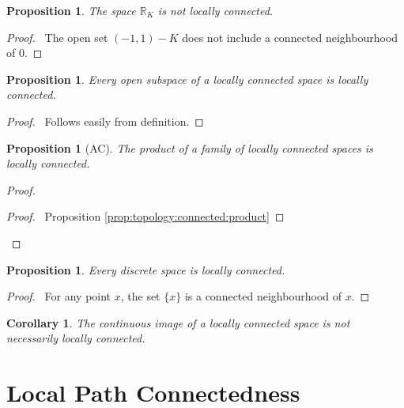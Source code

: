 \documentclass{report}
\let\qed\relax
\newtheorem{prop}[lm]{Proposition}
\newtheorem{cor}{Corollary}[lm]
\theoremstyle{definition}
\begin{document}
 \begin{prop}
  The space $\mathbb{R}_K$ is not locally connected.
\end{prop}

\begin{proof}
 \pf\ The open set $(-1,1) - K$ does not include a connected neighbourhood of
0. \qed
\end{proof}

\begin{prop}
  Every open subspace of a locally connected space is locally connected.
\end{prop}

\begin{proof}
  \pf\ Follows easily from definition. \qed
\end{proof}

\begin{prop}[AC]
  The product of a family of locally connected spaces is locally connected.
\end{prop}

\begin{proof}
  \pf
  \begin{proof}
    \pf\ Proposition \ref{prop:topology:connected:product}
  \end{proof}
  \qed
\end{proof}

\begin{prop}
  Every discrete space is locally connected.
\end{prop}

\begin{proof}
  \pf\ For any point $x$, the set $\{x\}$ is a connected neighbourhood of $x$. \qed
\end{proof}

\begin{cor}
  The continuous image of a locally connected space is not necessarily locally connected.
\end{cor}

  \section{Local Path Connectedness}
\end{document}
